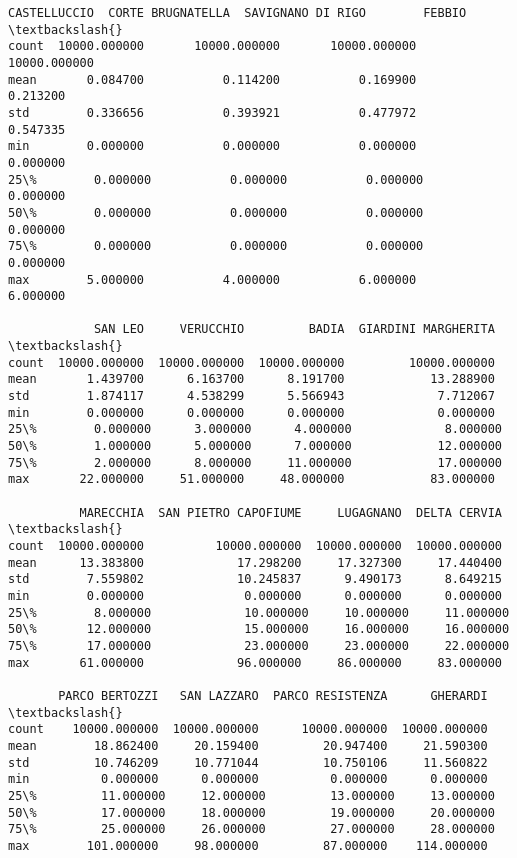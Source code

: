 \documentclass[11pt]{article}
\makeatletter
\newcommand{\boxspacing}{\kern\kvtcb@left@rule\kern\kvtcb@boxsep}
\newcommand{\prompt}[4]{
        {\ttfamily\llap{{\color{#2}[#3]:\hspace{3pt}#4}}\vspace{-\baselineskip}}
    }
\makeatother
\begin{document}
            \begin{tcolorbox}[breakable, size=fbox, boxrule=.5pt, pad at break*=1mm, opacityfill=0]
\prompt{Out}{outcolor}{24}{\boxspacing}
\begin{Verbatim}[commandchars=\\\{\}]
       CASTELLUCCIO  CORTE BRUGNATELLA  SAVIGNANO DI RIGO        FEBBIO  \textbackslash{}
count  10000.000000       10000.000000       10000.000000  10000.000000
mean       0.084700           0.114200           0.169900      0.213200
std        0.336656           0.393921           0.477972      0.547335
min        0.000000           0.000000           0.000000      0.000000
25\%        0.000000           0.000000           0.000000      0.000000
50\%        0.000000           0.000000           0.000000      0.000000
75\%        0.000000           0.000000           0.000000      0.000000
max        5.000000           4.000000           6.000000      6.000000

            SAN LEO     VERUCCHIO         BADIA  GIARDINI MARGHERITA  \textbackslash{}
count  10000.000000  10000.000000  10000.000000         10000.000000
mean       1.439700      6.163700      8.191700            13.288900
std        1.874117      4.538299      5.566943             7.712067
min        0.000000      0.000000      0.000000             0.000000
25\%        0.000000      3.000000      4.000000             8.000000
50\%        1.000000      5.000000      7.000000            12.000000
75\%        2.000000      8.000000     11.000000            17.000000
max       22.000000     51.000000     48.000000            83.000000

          MARECCHIA  SAN PIETRO CAPOFIUME     LUGAGNANO  DELTA CERVIA  \textbackslash{}
count  10000.000000          10000.000000  10000.000000  10000.000000
mean      13.383800             17.298200     17.327300     17.440400
std        7.559802             10.245837      9.490173      8.649215
min        0.000000              0.000000      0.000000      0.000000
25\%        8.000000             10.000000     10.000000     11.000000
50\%       12.000000             15.000000     16.000000     16.000000
75\%       17.000000             23.000000     23.000000     22.000000
max       61.000000             96.000000     86.000000     83.000000

       PARCO BERTOZZI   SAN LAZZARO  PARCO RESISTENZA      GHERARDI  \textbackslash{}
count    10000.000000  10000.000000      10000.000000  10000.000000
mean        18.862400     20.159400         20.947400     21.590300
std         10.746209     10.771044         10.750106     11.560822
min          0.000000      0.000000          0.000000      0.000000
25\%         11.000000     12.000000         13.000000     13.000000
50\%         17.000000     18.000000         19.000000     20.000000
75\%         25.000000     26.000000         27.000000     28.000000
max        101.000000     98.000000         87.000000    114.000000


\end{Verbatim}
\end{tcolorbox}
\end{document}
